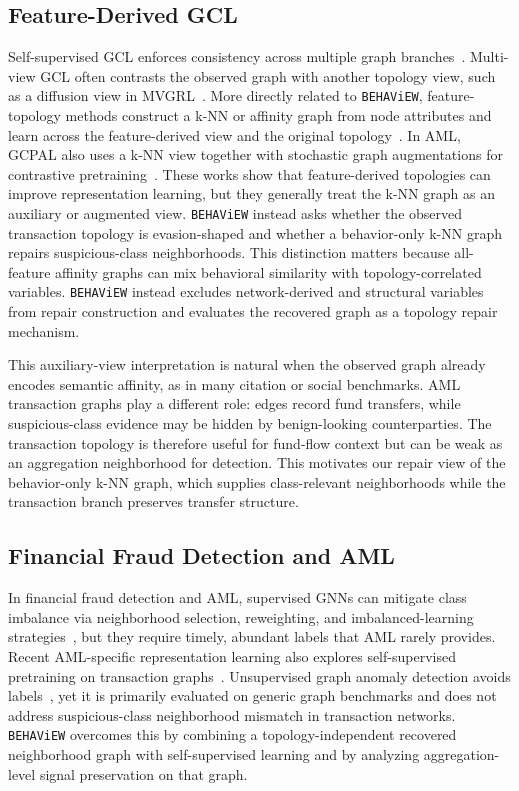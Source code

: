 \documentclass[sigconf,natbib=true,anonymous=true]{acmart}
\theoremstyle{definition}
\newcommand{\method}{\texttt{BEHAViEW}\xspace}
\begin{document}
\subsection{Feature-Derived GCL}
Self-supervised GCL enforces consistency across multiple graph branches~\cite{velivckovic2018deep,you2020graph}. Multi-view GCL often contrasts the observed graph with another topology view, such as a diffusion view in MVGRL~\cite{hassani2020contrastive}. More directly related to \method, feature-topology methods construct a k-NN or affinity graph from node attributes and learn across the feature-derived view and the original topology~\cite{shang2023mlgcl,fan2021featuretopology,chen2023asp}. In AML, GCPAL also uses a k-NN view together with stochastic graph augmentations for contrastive pretraining~\cite{lu2024graph}. These works show that feature-derived topologies can improve representation learning, but they generally treat the k-NN graph as an auxiliary or augmented view. \method instead asks whether the observed transaction topology is evasion-shaped and whether a behavior-only k-NN graph repairs suspicious-class neighborhoods. This distinction matters because all-feature affinity graphs can mix behavioral similarity with topology-correlated variables. \method instead excludes network-derived and structural variables from repair construction and evaluates the recovered graph as a topology repair mechanism.

This auxiliary-view interpretation is natural when the observed graph already encodes semantic affinity, as in many citation or social benchmarks. AML transaction graphs play a different role: edges record fund transfers, while suspicious-class evidence may be hidden by benign-looking counterparties. The transaction topology is therefore useful for fund-flow context but can be weak as an aggregation neighborhood for detection. This motivates our repair view of the behavior-only k-NN graph, which supplies class-relevant neighborhoods while the transaction branch preserves transfer structure.

\subsection{Financial Fraud Detection and AML}
In financial fraud detection and AML, supervised GNNs can mitigate class imbalance via neighborhood selection, reweighting, and imbalanced-learning strategies~\cite{dou2020enhancing,liu2021pick,zhao2021graphsmote,song2022tam}, but they require timely, abundant labels that AML rarely provides. Recent AML-specific representation learning also explores self-supervised pretraining on transaction graphs~\cite{cardoso2022laundrograph,lu2024graph}. Unsupervised graph anomaly detection avoids labels~\cite{ding2019dominant,liu2021anomaly,jin2021anemone,tang2022rethinking,liu2022bond}, yet it is primarily evaluated on generic graph benchmarks and does not address suspicious-class neighborhood mismatch in transaction networks. \method overcomes this by combining a topology-independent recovered neighborhood graph with self-supervised learning and by analyzing aggregation-level signal preservation on that graph.
\end{document}
